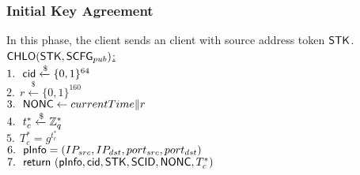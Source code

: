 \subsubsection{Initial Key Agreement}
In this phase, the client sends an client with source
address token $\mathsf{STK}$.
\\
\noindent
\underline{$\mathsf{CHLO}(\mathsf{STK}, \mathsf{SCFG}_{pub})$:} \\
 $1.\ \ \mathsf{cid} \xleftarrow{\$} \{0,1\}^{64}$ \\
 $2.\ \ r \xleftarrow{\$} \{0,1\}^{160}$ \\
 $3.\ \ \mathsf{NONC} \leftarrow currentTime \| r$ \\
 $4.\ \ t_c^{\ast} \xleftarrow{\$} \mathbb{Z}_{q}^{\ast}$ \\
 $5.\ \ T_c^{\ast} = g^{t_c^{\ast}}$ \\
 $6.\ \ \mathsf{pInfo} = (IP_{src}, IP_{dst}, port_{src}, port_{dst})$ \\
 $7.\ \ \mathsf{return}\ (\mathsf{pInfo}, \mathsf{cid}, \mathsf{STK}, \mathsf{SCID}, \mathsf{NONC}, T_c^{\ast})$ \\
